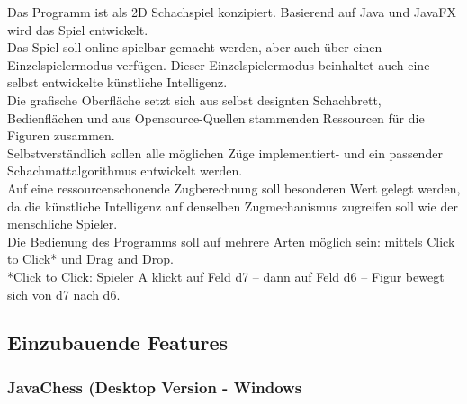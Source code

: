 \documentclass[12pt,a4paper]{article}
\begin{document}
Das Programm ist als 2D Schachspiel konzipiert. Basierend auf Java und JavaFX wird das Spiel entwickelt. \\
Das Spiel soll online spielbar gemacht werden, aber auch über einen Einzelspielermodus verfügen. Dieser Einzelspielermodus beinhaltet auch eine selbst entwickelte künstliche Intelligenz. \\
Die grafische Oberfläche setzt sich aus selbst designten Schachbrett, Bedienflächen und aus Opensource-Quellen stammenden Ressourcen für die Figuren zusammen.\\
Selbstverständlich sollen alle möglichen Züge implementiert- und ein passender Schachmattalgorithmus entwickelt werden. \\
Auf eine ressourcenschonende Zugberechnung soll besonderen Wert gelegt werden, da die künstliche Intelligenz auf denselben Zugmechanismus zugreifen soll wie der menschliche Spieler. \\
Die Bedienung des Programms soll auf mehrere Arten möglich sein:  mittels Click to Click* und Drag and Drop.\\
*Click to Click: Spieler A klickt auf Feld d7 – dann auf Feld d6 – Figur bewegt sich von d7 nach d6.

\subsection{Einzubauende Features}

\subsubsection{JavaChess (Desktop Version - Windows}
\end{document}

